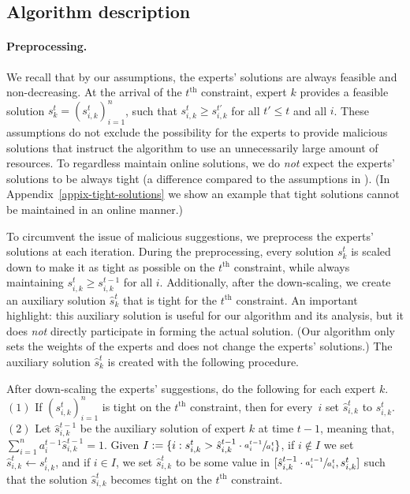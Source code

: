 \subsection{Algorithm description} \label{sec:algo}

\paragraph{Preprocessing.}
We recall that by our assumptions, the experts' solutions are always feasible and non-decreasing. At the arrival of the $t^{\text{th}}$ constraint, expert $k$ provides a feasible solution $s_{k}^{t} = (s_{i,k}^{t})_{i=1}^{n}$, such that $s_{i,k}^{t} \ge s_{i,k}^{t'}$ for all $t' \le t$ and all $i$. These assumptions do not exclude the possibility for the experts to provide malicious solutions that instruct the algorithm to use an unnecessarily large amount of resources.
To regardless maintain online solutions, we do \emph{not} expect the experts' solutions to be always tight (a difference compared to the assumptions in \cite{AnandGe22:Online-Algorithms}).
(In Appendix~\ref{appix-tight-solutions}
we show an example that tight solutions cannot be maintained in an online manner.)

To circumvent the issue of malicious suggestions, we preprocess the experts' solutions at each iteration. During the preprocessing, every solution $s_k^t$ is scaled down to make it as tight as possible on the $t^{\text{th}}$ constraint, while always maintaining $s_{i,k}^{t} \geq s_{i,k}^{t-1}$ for all $i$. Additionally, after the down-scaling, we create an auxiliary solution $\hat{s}_k^t$ that is tight for the $t^{\text{th}}$ constraint. An important highlight: this auxiliary solution is useful for our algorithm and its analysis, but it does \emph{not} directly participate in forming the actual solution. (Our algorithm only sets the weights of the experts and does not change the experts' solutions.) The auxiliary solution $\hat{s}_k^t$ is created with the following procedure.

After down-scaling the experts' suggestions, do the following for each expert $k$. $(1)$ If $(s_{i,k}^{t})_{i=1}^{n}$ is tight on the $t^{\text{th}}$ constraint, then for every~$i$ set $\hat{s}_{i,k}^{t}$ to $s_{i,k}^{t}$. $(2)$ Let $\hat{s}_{i,k}^{t-1}$ be the auxiliary solution of expert $k$ at time $t-1$, meaning that, $\sum_{i=1}^{n} a_{i}^{t-1} \hat{s}_{i,k}^{t-1} = 1$. Given $I := \{i: s_{i,k}^{t} > \hat{s}_{i,k}^{t-1} \cdot \sfrac{a_{i}^{t-1}}{a_{i}^{t}} \}$, if $i \notin I$ we set $\hat{s}_{i,k}^{t} \gets s_{i,k}^{t}$, and if $i \in I$, we set $\hat{s}_{i,k}^{t}$ to be some value in $[\hat{s}_{i,k}^{t-1} \cdot \sfrac{a_{i}^{t-1}}{a_{i}^{t}}, s_{i,k}^{t}]$ such that the solution $\hat{s}_{i,k}^{t}$ becomes tight on the $t^{\text{th}}$ constraint.


